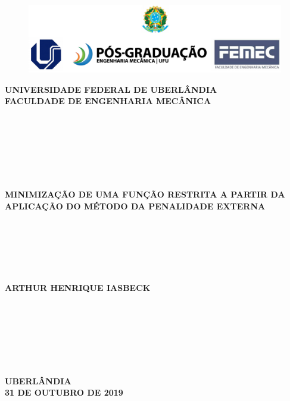 \documentclass[12pt]{article}
\begin{document}
	\singlespacing %
	
	\thispagestyle{empty}
	
	\begin{figure}[H]
		\centering
		\includegraphics[width=\linewidth]{cabecalho.png}
	\end{figure}
	
	\begin{center}
		\large
		\textbf{UNIVERSIDADE FEDERAL DE UBERLÂNDIA} \\ \vspace{0.3cm}
		\textbf{FACULDADE DE ENGENHARIA MECÂNICA} \\~\\~\\~\\~\\~\\~\\~\\
		\Large
		\textbf{MINIMIZAÇÃO DE UMA FUNÇÃO RESTRITA A PARTIR DA APLICAÇÃO DO MÉTODO DA PENALIDADE EXTERNA} \\~\\~\\~\\~\\~\\~\\
		\large
		\textbf{ARTHUR HENRIQUE IASBECK} \\~\\~\\~\\~\\~\\~\\~\\
		\large
		\textbf{UBERLÂNDIA} \\
		\textbf{31 DE OUTUBRO DE 2019}
	\end{center}
	\newpage
	\restoregeometry
	
	\setcounter{page}{1} %
	
\end{document}

